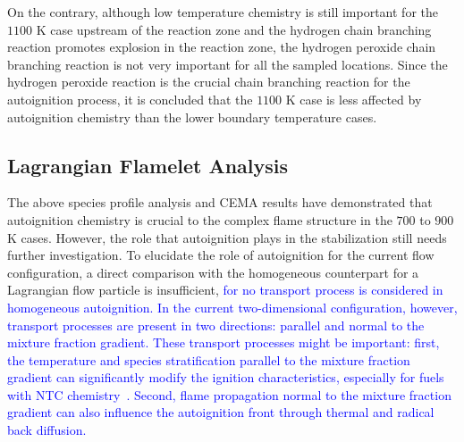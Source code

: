 \documentclass[review,3p,times]{elsarticle}
\begin{document}

On the contrary, although low temperature chemistry is still important for the $1100$ K case upstream of the reaction zone and the hydrogen chain branching reaction promotes explosion in the reaction zone, the hydrogen peroxide chain branching reaction is not very important for all the sampled locations.  Since the hydrogen peroxide reaction is the crucial chain branching reaction for the autoignition process, it is concluded that the $1100$ K case is less affected by autoignition chemistry than the lower boundary temperature cases.  

\subsection{Lagrangian Flamelet Analysis} \label{sec:LFA}
The above species profile analysis and CEMA results have demonstrated that autoignition chemistry is crucial to the complex flame structure in the $700$ to $900$ K cases.  However, the role that autoignition plays in the stabilization still needs further investigation.  To elucidate the role of autoignition for the current flow configuration, a direct comparison with the homogeneous counterpart for a Lagrangian flow particle is insufficient, \textcolor{blue}{for no transport process is considered in homogeneous autoignition.  In the current two-dimensional configuration, however, transport processes are present in two directions: parallel and normal to the mixture fraction gradient.  These transport processes might be important: first, the temperature and species stratification parallel to the mixture fraction gradient can significantly modify the ignition characteristics, especially for fuels with NTC chemistry~\cite{law12,deng14}.  Second, flame propagation normal to the mixture fraction gradient can also influence the autoignition front through thermal and radical back diffusion.}
\end{document}
